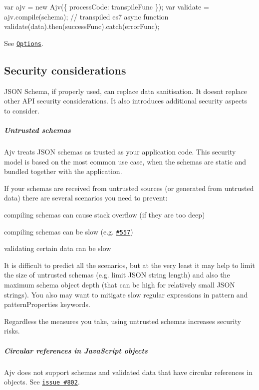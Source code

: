 \begin{DoxyCode}
var ajv = new Ajv(\{ processCode: transpileFunc \});
var validate = ajv.compile(schema); // transpiled es7 async function
validate(data).then(successFunc).catch(errorFunc);
\end{DoxyCode}


See \href{#options}{\tt Options}.

\subsection*{Security considerations}

J\+S\+ON Schema, if properly used, can replace data sanitisation. It doesn\textquotesingle{}t replace other A\+PI security considerations. It also introduces additional security aspects to consider.

\subparagraph*{Untrusted schemas}

Ajv treats J\+S\+ON schemas as trusted as your application code. This security model is based on the most common use case, when the schemas are static and bundled together with the application.

If your schemas are received from untrusted sources (or generated from untrusted data) there are several scenarios you need to prevent\+:
\begin{DoxyItemize}
\item compiling schemas can cause stack overflow (if they are too deep)
\item compiling schemas can be slow (e.\+g. \href{https://github.com/epoberezkin/ajv/issues/557}{\tt \#557})
\item validating certain data can be slow
\end{DoxyItemize}

It is difficult to predict all the scenarios, but at the very least it may help to limit the size of untrusted schemas (e.\+g. limit J\+S\+ON string length) and also the maximum schema object depth (that can be high for relatively small J\+S\+ON strings). You also may want to mitigate slow regular expressions in {\ttfamily pattern} and {\ttfamily pattern\+Properties} keywords.

Regardless the measures you take, using untrusted schemas increases security risks.

\subparagraph*{Circular references in Java\+Script objects}

Ajv does not support schemas and validated data that have circular references in objects. See \href{https://github.com/epoberezkin/ajv/issues/802}{\tt issue \#802}.

